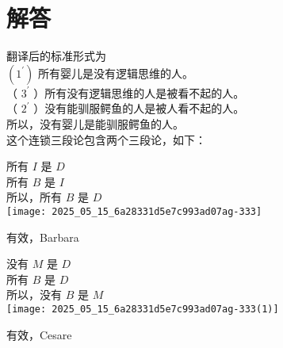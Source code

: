 \section*{解答}
翻译后的标准形式为\\
$\left(1^{\prime}\right)$ 所有婴儿是没有逻辑思维的人。\\
（ $3^{\prime}$ ）所有没有逻辑思维的人是被看不起的人。\\
（ $2^{\prime}$ ）没有能驯服鳄鱼的人是被人看不起的人。\\
所以，没有婴儿是能驯服鳄鱼的人。\\
这个连锁三段论包含两个三段论，如下：

所有 $I$ 是 $D$\\
所有 $B$ 是 $I$\\
所以，所有 $B$ 是 $D$\\
\texttt{[image: 2025\_05\_15\_6a28331d5e7c993ad07ag-333]}

有效，Barbara

没有 $M$ 是 $D$\\
所有 $B$ 是 $D$\\
所以，没有 $B$ 是 $M$\\
\texttt{[image: 2025\_05\_15\_6a28331d5e7c993ad07ag-333(1)]}

有效，Cesare

